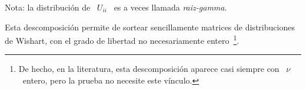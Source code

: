%
Nota: la distribuci\'on de \ $U_{ii}$ \ es a veces llamada {\em raiz-gamma}.

Esta   descomposici\'on   permite   de   sortear   sencillamente   matrices   de
distribuciones  de   Wishart,  con  el  grado  de   libertad  no  necesariamente
entero~\footnote{De hecho, en la  literatura, esta descomposici\'on aparece casi
  siempre con \ $\nu$ \ entero, pero la prueba no necesite este v\'inculo.}.
